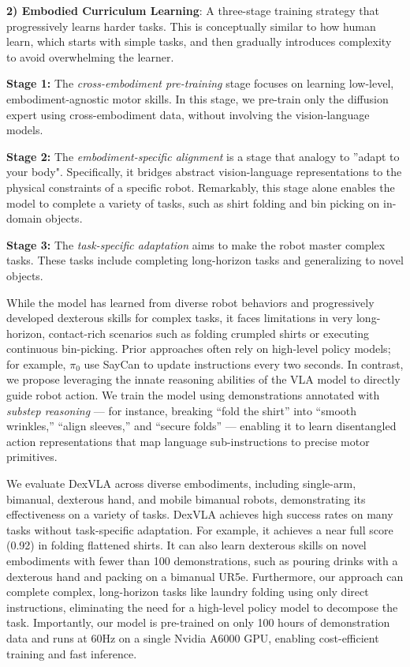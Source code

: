 \textbf{2) Embodied Curriculum Learning}: A three-stage training strategy that progressively learns harder tasks. This is conceptually similar to how human learn, which starts with simple tasks, and then gradually introduces complexity to avoid overwhelming the learner.

\textbf{Stage 1:} The \textit{cross-embodiment pre-training}  stage focuses on learning low-level, embodiment-agnostic motor skills. In this stage, we pre-train only the diffusion expert using cross-embodiment data, without involving the vision-language models.

\textbf{Stage 2:} The \textit{embodiment-specific alignment} is a stage that analogy to ''adapt to your body". Specifically, it bridges abstract vision-language representations to the physical constraints of a specific robot. Remarkably, this stage alone enables the model to complete a variety of tasks, such as shirt folding and bin picking on in-domain objects.

\textbf{Stage 3:} The \textit{task-specific adaptation} aims to make the robot master complex tasks. These tasks include completing long-horizon tasks and generalizing to novel objects. 


While the model has learned from diverse robot behaviors and progressively developed dexterous skills for complex tasks, it faces limitations in very long-horizon, contact-rich scenarios such as folding crumpled shirts or executing continuous bin-picking. Prior approaches often rely on high-level policy models; for example, $\pi_{0}$ use SayCan to update instructions every two seconds. In contrast, we propose leveraging the innate reasoning abilities of the VLA model to directly guide robot action. We train the model using demonstrations annotated with \textit{substep reasoning} — for instance, breaking “fold the shirt” into “smooth wrinkles,” “align sleeves,” and “secure folds” — enabling it to learn disentangled action representations that map language sub-instructions to precise motor primitives. 


We evaluate DexVLA across diverse embodiments, including single-arm, bimanual, dexterous hand, and mobile bimanual robots, demonstrating its effectiveness on a variety of tasks. DexVLA achieves high success rates on many tasks without task-specific adaptation. For example, it achieves a near full score (0.92) in folding flattened shirts. It can also learn dexterous skills on novel embodiments with fewer than 100 demonstrations, such as pouring drinks with a dexterous hand and packing on a bimanual UR5e. Furthermore, our approach can complete complex, long-horizon tasks like laundry folding using only direct instructions, eliminating the need for a high-level policy model to decompose the task. Importantly, our model is pre-trained on only 100 hours of demonstration data and runs at 60Hz on a single Nvidia A6000 GPU, enabling cost-efficient training and fast inference.

